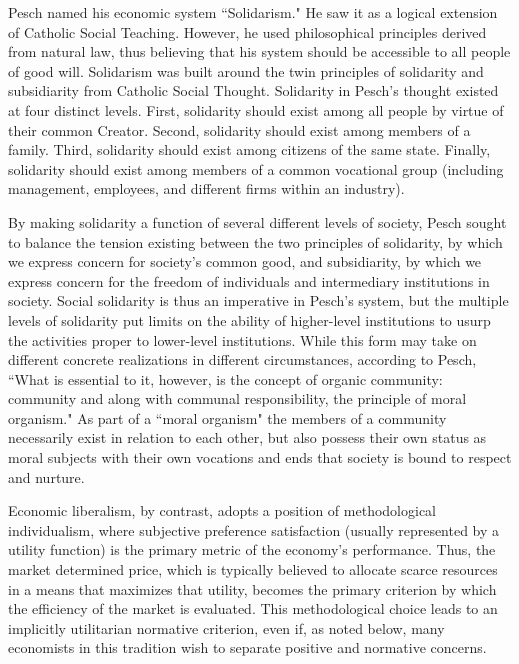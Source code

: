 \documentclass{article}
\begin{document}
Pesch named his economic system ``Solidarism."  He saw it as a logical extension of Catholic Social Teaching.  However, he used philosophical principles derived from natural law, thus believing that his system should be accessible to all people of good will.  Solidarism was built around the twin principles of solidarity and subsidiarity from Catholic Social Thought.  Solidarity in Pesch’s thought existed at four distinct levels.  First, solidarity should exist among all people by virtue of their common Creator.  Second, solidarity should exist among members of a family.  Third, solidarity should exist among citizens of the same state.  Finally, solidarity should exist among members of a common vocational group (including management, employees, and different firms within an industry). \citep[pp. 69-70]{pesch1998}\medskip

By making solidarity a function of several different levels of society, Pesch sought to balance the tension existing between the two principles of solidarity, by which we express concern for society’s common good, and subsidiarity, by which we express concern for the freedom of individuals and intermediary institutions in society.  Social solidarity is thus an imperative in Pesch’s system, but the multiple levels of solidarity put limits on the ability of higher-level institutions to usurp the activities proper to lower-level institutions.  While this form may take on different concrete realizations in different circumstances, according to Pesch, ``What is essential to it, however, is the concept of organic community:  community and along with communal responsibility, the principle of moral organism." \citep[p. 81]{pesch1998}  As part of a ``moral organism" the members of a community necessarily exist in relation to each other, but also possess their own status as moral subjects with their own vocations and ends that society is bound to respect and nurture.\medskip

Economic liberalism, by contrast, adopts a position of methodological individualism, where subjective preference satisfaction (usually represented by a utility function) is the primary metric of the economy’s performance.  Thus, the market determined price, which is typically believed to allocate scarce resources in a means that maximizes that utility, becomes the primary criterion by which the efficiency of the market is evaluated.  This methodological choice leads to an implicitly utilitarian normative criterion, even if, as noted below, many economists in this tradition wish to separate positive and normative concerns.\medskip
\end{document}
